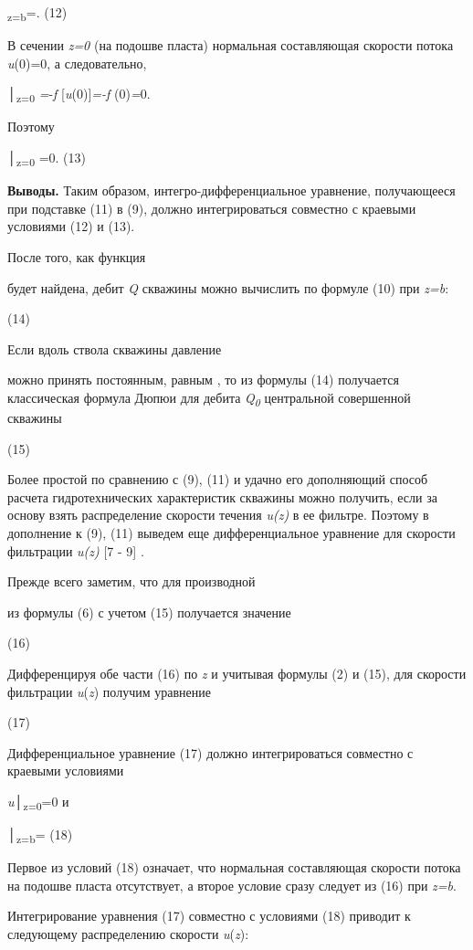 \begin{multicols}{2}
\textbar{}\textsubscript{z=b}=.
(12)

В сечении \emph{z=0} (на подошве пласта) нормальная составляющая
скорости потока \emph{u}(0)=0, а следовательно,

│\textsubscript{z=0}
\emph{=}-\emph{f} {[}\emph{u}(0){]}\emph{=-f} (0)\emph{=}0.

Поэтому

│\textsubscript{z=0}
=0. (13)

{\bfseries Выводы.} Таким образом, интегро-дифференциальное уравнение,
получающееся при подставке (11) в (9), должно интегрироваться совместно
с краевыми условиями (12) и (13).

После того, как функция

будет найдена, дебит \emph{Q} скважины можно вычислить по формуле (10)
при \emph{z=b}:


(14)

Если вдоль ствола скважины давление

можно принять постоянным, равным
, то
из формулы (14) получается классическая формула Дюпюи для дебита
\emph{Q\textsubscript{0}} центральной совершенной скважины


(15)

Более простой по сравнению с (9), (11) и удачно его дополняющий способ
расчета гидротехнических характеристик скважины можно получить, если за
основу взять распределение скорости течения \emph{u(z)} в ее фильтре.
Поэтому в дополнение к (9), (11) выведем еще дифференциальное уравнение
для скорости фильтрации \emph{u(z)} {[}7 - 9{]} .

Прежде всего заметим, что для производной

из формулы (6) с учетом (15) получается значение




(16)

Дифференцируя обе части (16) по \emph{z} и учитывая формулы (2) и (15),
для скорости фильтрации \emph{u}(\emph{z}) получим уравнение


(17)

Дифференциальное уравнение (17) должно интегрироваться совместно с
краевыми условиями

\emph{u}│\textsubscript{z=0}=0 и

│\textsubscript{z=b}=
(18)

Первое из условий (18) означает, что нормальная составляющая скорости
потока на подошве пласта отсутствует, а второе условие сразу следует из
(16) при \emph{z=b}.

Интегрирование уравнения (17) совместно с условиями (18) приводит к
следующему распределению скорости \emph{u}(\emph{z}):


\end{multicols}
